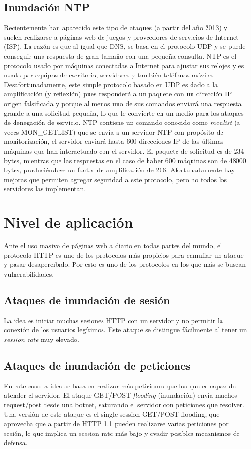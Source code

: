 \subsection{Inundación NTP}
Recientemente han aparecido este tipo de ataques (a partir del a\~no 2013) y suelen realizarse a páginas web de juegos y proveedores de servicios de Internet (ISP). La razón es que al igual que DNS, se basa en el protocolo UDP y se puede conseguir una respuesta de gran tama\~no con una peque\~na consulta. 
NTP es el protocolo usado por máquinas conectadas a Internet para ajustar sus relojes y es usado por equipos de escritorio, servidores y también teléfonos móviles. Desafortunadamente, este simple protocolo basado en UDP es dado a la amplificación (y reflexión) pues responderá a un paquete con un dirección IP origen falsificada y porque al menos uno de sus comandos enviará una respuesta grande a una solicitud peque\~na, lo que le convierte en un medio para los ataques de denegación de servicio. 
NTP contiene un comando conocido como \textit{monlist} (a veces MON\_GETLIST) que se envía a un servidor NTP con propósito de monitorización, el servidor enviará hasta 600 direcciones IP de las últimas máquinas que han interactuado con el servidor. El paquete de solicitud es de 234 bytes, mientras que las respuestas en el caso de haber 600 máquinas son de 48000 bytes, produciéndose un factor de amplificación de 206.
Afortunadamente hay mejoras que permiten agregar seguridad a este protocolo, pero no todos los servidores las implementan\cite{ntp-cloudfare}.

\section{Nivel de aplicación}
Ante el uso masivo de páginas web a diario en todas partes del mundo, el protocolo HTTP es uno de los protocolos más propicios para camuflar un ataque y pasar desapercibido. Por esto es uno de los protocolos en los que más se buscan vulnerabilidades.

\subsection{Ataques de inundación de sesión}
La idea es iniciar muchas sesiones HTTP con un servidor y no permitir la conexión de los usuarios legítimos. Este ataque se distingue fácilmente al tener un \textit{session rate} muy elevado\cite{soa-dos}.

\subsection{Ataques de inundación de peticiones}
En este caso la idea se basa en realizar más peticiones que las que es capaz de atender el servidor. El ataque GET/POST \textit{flooding} (inundación) envía muchos request/post desde una botnet, saturando el servidor con peticiones que resolver. Una versión de este ataque es el single-session GET/POST flooding, que aprovecha que a partir de HTTP 1.1 pueden realizarse varias peticiones por sesión, lo que implica un session rate más bajo y evadir posibles mecanismos de defensa\cite{soa-dos}.

